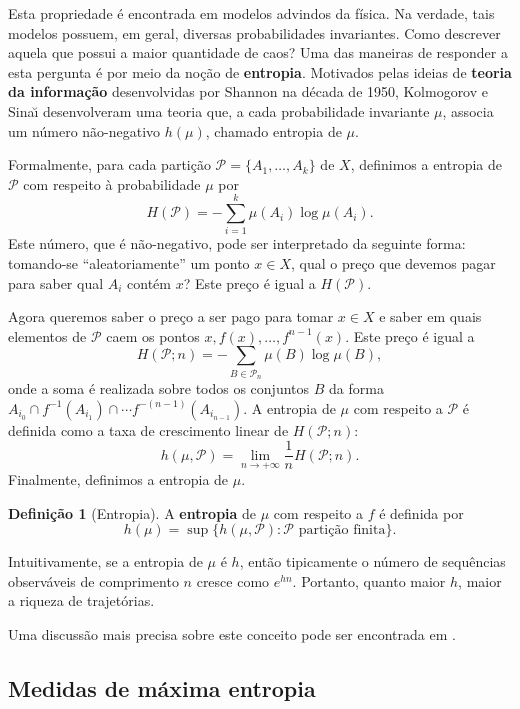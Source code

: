 \documentclass{hipatia}
\theoremstyle{definition}
\newtheorem{definition}[theorem]{Definição}
\theoremstyle{remark}
\numberwithin{equation}{section}
\numberwithin{theorem}{section}
\newcommand{\mathfs}[1]{\mathscr{#1}}
\begin{document}
Esta propriedade é encontrada em modelos advindos da física. Na verdade, tais modelos possuem, em geral, diversas probabilidades invariantes. Como descrever aquela que possui a maior quantidade de caos?
Uma das maneiras de responder a esta pergunta é por meio da noção de {\bf entropia}.
Motivados pelas ideias de {\bf teoria da informação} desenvolvidas por Shannon na década de 1950, Kolmogorov e Sina\u{\i} desenvolveram uma teoria que, a cada probabilidade invariante $\mu$, associa um número não-negativo $h(\mu)$, chamado entropia de $\mu$. 

Formalmente, para cada partição $\mathfs P=\{A_1,\ldots,A_k\}$ de $X$, definimos a entropia de 
$\mathfs P$ com respeito à probabilidade $\mu$ por 
$$
H(\mathfs P)=-\sum_{i=1}^k \mu(A_i)\log\mu(A_i).$$
Este número, que é não-negativo, pode ser interpretado da seguinte forma: tomando-se ``aleatoriamente''
um ponto $x\in X$, qual o preço que devemos pagar para saber qual $A_i$ contém $x$? Este preço é igual a
$H(\mathfs P)$. 

Agora queremos saber o preço a ser pago para tomar $x\in X$ e saber em quais elementos de $\mathfs P$ caem os pontos $x,f(x),\ldots,f^{n-1}(x)$. Este preço é igual a
$$
H(\mathfs P; n)=-\sum_{B\in \mathfs P_n} \mu(B)\log \mu(B),
$$
onde a soma é realizada sobre todos os conjuntos $B$ da forma 
$A_{i_0}\cap f^{-1}(A_{i_1})\cap\cdots f^{-(n-1)}(A_{i_{n-1}})$.
A entropia de $\mu$ com respeito a $\mathfs P$ é definida como a taxa de crescimento linear de 
$H(\mathfs P;n)$:
$$
h(\mu,\mathfs P)=\lim_{n\to+\infty} \frac{1}{n}H(\mathfs P;n).
$$
Finalmente, definimos a entropia de $\mu$.


\begin{definition}[Entropia]
A {\bf entropia} de $\mu$ com respeito a $f$ é definida por
$$
h(\mu)=\sup\{h(\mu,\mathfs P):\mathfs P\text{ partição finita}\}.
$$
\end{definition}


Intuitivamente, se a entropia de $\mu$ é $h$, então tipicamente o número de sequências 
observáveis de comprimento $n$ cresce como $e^{hn}$. Portanto, quanto maior $h$,
maior a riqueza de trajetórias.

Uma discussão mais precisa sobre este conceito pode ser encontrada em \cite{viana-oliveira}.

\subsection{Medidas de máxima entropia}
\end{document}
